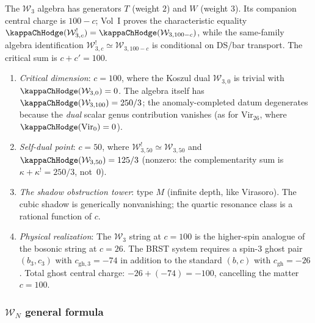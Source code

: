 \begin{computation}
The $\mathcal{W}_3$ algebra has generators $T$ (weight $2$)
and $W$ (weight $3$). Its companion central charge is
$100-c$; Vol~I proves the characteristic equality
$\kappaChHodge(\mathcal{W}_{3,c}^!)=\kappaChHodge(\mathcal{W}_{3,100-c})$,
while the same-family algebra identification
$\mathcal{W}_{3,c}^! \simeq \mathcal{W}_{3,100-c}$ is conditional
on DS/bar transport. The critical sum is $c+c'=100$.

\begin{enumerate}[label=\textup{(\roman*)}]
\item \emph{Critical dimension}: $c = 100$, where the Koszul dual
 $\mathcal{W}_{3,0}$ is trivial with
 $\kappaChHodge(\mathcal{W}_{3,0}) = 0$.
 The algebra itself has $\kappaChHodge(\mathcal{W}_{3,100}) = 250/3$;
 the anomaly-completed datum degenerates because the
 \emph{dual} scalar genus contribution vanishes (as for
 $\mathrm{Vir}_{26}$, where $\kappaChHodge(\mathrm{Vir}_0) = 0$).
\item \emph{Self-dual point}: $c = 50$, where
 $\mathcal{W}_{3,50}^! \simeq \mathcal{W}_{3,50}$
 and $\kappaChHodge(\mathcal{W}_{3,50}) = 125/3$
 (nonzero: the complementarity sum is
 $\kappa + \kappa^! = 250/3$, not~$0$).
\item \emph{The shadow obstruction tower}: type $M$ (infinite depth,
 like Virasoro).
 The cubic shadow is generically nonvanishing; the
 quartic resonance class is a rational function of $c$.
\item \emph{Physical realization}: The $\mathcal{W}_3$
 string at $c = 100$ is the higher-spin analogue of the
 bosonic string at $c = 26$. The BRST system requires a
 spin-$3$ ghost pair $(b_3, c_3)$ with
 $c_{\mathrm{gh},3} = -74$ in addition to the standard
 $(b, c)$ with $c_{\mathrm{gh}} = -26$.
 Total ghost central charge: $-26 + (-74) = -100$,
 cancelling the matter $c = 100$.
\end{enumerate}
\end{computation}

\subsubsection{$\mathcal{W}_N$ general formula}

